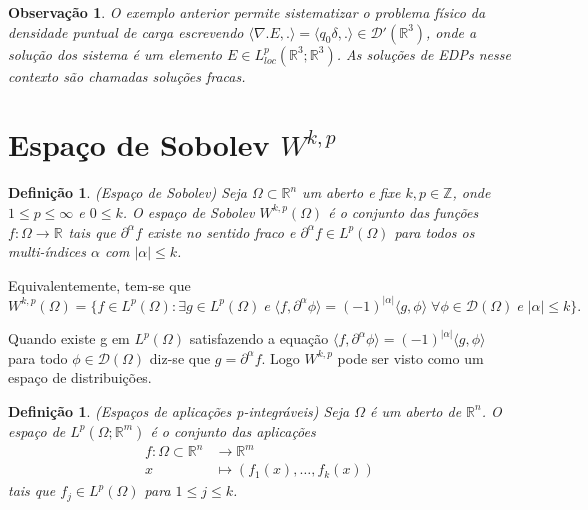 \documentclass[12pt]{book}
\newtheorem{definicao}[teorema]{Definição}
\newtheorem{observacao}[teorema]{Observação}
\newcommand{\distribuicoesgeral}[1]{\mathcal{D'}(#1)}
\newcommand{\espacoLp}[1]{L^{p}(#1)}
\newcommand{\espacoLpcomp}[1]{L^{p}_{loc}(#1)}
\newcommand{\espacoLpcontradominio}[2]{L^{p}(#1;#2)}
\newcommand{\funcoesteste}{\funcoestestegeral{\Omega}}
\newcommand{\funcoestestegeral}[1]{\mathcal{D}(#1)}
\newcommand{\inteiros}{\mathbb{Z}}
\newcommand{\produtointerno}[2]{\langle #1, #2 \rangle}
\newcommand{\real}[1]{\mathbb{R}^{#1}}
\newcommand{\reta}{\real{}}
\begin{document}
	\begin{observacao}
		O exemplo anterior permite sistematizar o problema físico da densidade puntual de carga escrevendo $\produtointerno{\nabla.E}{.} = \produtointerno{q_{0}\delta}{.} \in \distribuicoesgeral{\real{3}}$, onde a solução dos sistema é um elemento $E\in \espacoLpcomp{\real{3};\real{3}}$. As soluções de EDPs nesse contexto são chamadas soluções fracas.
	\end{observacao}

	\section{Espaço de Sobolev $W^{k,p}$}\label{secao_espaco_sobolev}
	
	\begin{definicao}\label{definicao_espaco_sobolev}
		(Espaço de Sobolev) Seja $\Omega \subset \real{n}$ um aberto e fixe $k, p\in \inteiros$, onde $1\leq p \leq \infty$ e $0\leq k$. O espaço de Sobolev $W^{k,p} (\Omega)$ é o conjunto das funções $f:\Omega\to \reta$ tais que $\partial^{\alpha}f$ existe no sentido fraco e $\partial^{\alpha}f \in \espacoLp{\Omega}$ para todos os multi-índices $\alpha$ com $|\alpha|\leq k$.
	\end{definicao}
	
	Equivalentemente, tem-se que
	$$
	W^{k,p} (\Omega) = \{ f\in \espacoLp{\Omega}: \exists g \in \espacoLp{\Omega} \; e \;\produtointerno{f}{\partial^{\alpha}\phi} = (-1)^{|\alpha|}\produtointerno{g}{\phi}\; \forall \phi \in \funcoesteste \; e\; |\alpha|\leq k\}.
	$$
	
	Quando existe g em $\espacoLp{\Omega}$ satisfazendo a equação $\produtointerno{f}{\partial^{\alpha}\phi} = (-1)^{|\alpha|}\produtointerno{g}{\phi}$ para todo $\phi\in \funcoesteste$ diz-se que $g = \partial^{\alpha}f$. Logo $W^{k,p}$ pode ser visto como um espaço de distribuições.
	
	
	\begin{definicao}
		(Espaços de aplicações p-integráveis) Seja $\Omega$ é um aberto de $\real{n}$. O espaço de $\espacoLpcontradominio{\Omega}{\real{m}}$ é o conjunto das aplicações 
		$$
		\begin{aligned}
		f:\Omega \subset\real{n} &\to \real{m}
		\\
		x &\mapsto (f_{1}(x), \dots, f_{k}(x))
		\end{aligned}
		$$ 
		tais que $f_{j} \in \espacoLp{\Omega}$ para $1\leq j \leq k$.
 	\end{definicao}
	
\end{document}
